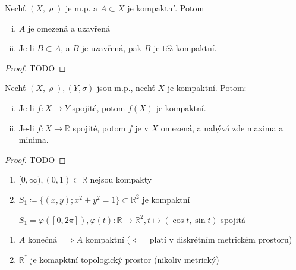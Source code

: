 \begin{veta}
  Nechť $(X, \varrho)$ je m.p. a $A \subset X$ je kompaktní. Potom

  \begin{enumerate}[i.]
    \item $A$ je omezená a uzavřená
    \item Je-li $B \subset A$, a $B$ je uzavřená, pak $B$ je též kompaktní.
  \end{enumerate}
\end{veta}

\begin{proof}
  TODO
\end{proof}

\begin{veta}
Nechť $(X, \varrho), (Y, \sigma)$ jsou m.p., nechť $X$ je kompaktní. Potom:

\begin{enumerate}[i.]
    \item Je-li $f: X \to Y$ spojité, potom $f(X)$ je kompaktní.
    \item Je-li $f: X \to \mathbb R$ spojité, potom $f$ je v $X$ omezená, a nabývá zde maxima a minima.
\end{enumerate}
\end{veta}

\begin{proof}
  TODO
\end{proof}

\begin{priklad}
  \begin{enumerate}[1.]
    \item $[0, \infty), (0,1) \subset \mathbb R$ nejsou kompakty
    \item $S_1 \coloneq \{(x, y); x^2+y^2=1\}\subset \mathbb R^2$ je kompaktní

    $S_1 = \varphi([0, 2\pi]), \varphi(t): \mathbb R \to \mathbb R^2, t\mapsto (\cos t, \sin t)$ spojitá
  \end{enumerate}
\end{priklad}

\begin{poznamka}
  \begin{enumerate}[1.]
    \item $A$ konečná $\implies A$ kompaktní ($\impliedby$ platí v diskrétním metrickém prostoru)
    \item $\mathbb R^*$ je komapktní topologický prostor (nikoliv metrický)
  \end{enumerate}
\end{poznamka}

